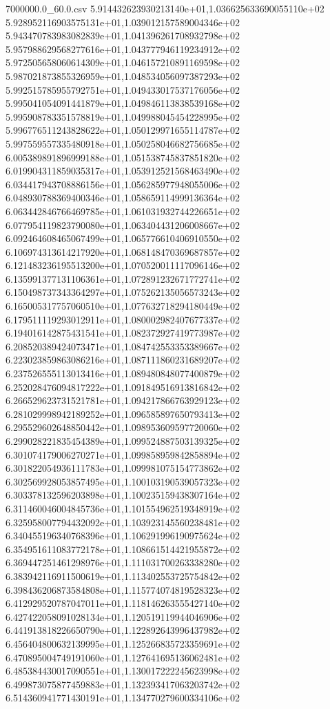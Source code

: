 \begin{filecontents*}{7000000.0_60.0.csv}
5.914432623930213140e+01,1.036625633690055110e+02
5.928952116903575131e+01,1.039012157589004346e+02
5.943470783983082839e+01,1.041396261708932798e+02
5.957988629568277616e+01,1.043777946119234912e+02
5.972505658060614309e+01,1.046157210891169598e+02
5.987021873855326959e+01,1.048534056097387293e+02
5.992515785955792751e+01,1.049433017537176056e+02
5.995041054091441879e+01,1.049846113838539168e+02
5.995908783351578819e+01,1.049988045454228995e+02
5.996776511243828622e+01,1.050129971655114787e+02
5.997559557335480918e+01,1.050258046682756685e+02
6.005389891896999188e+01,1.051538745837851820e+02
6.019904311859035317e+01,1.053912521568463490e+02
6.034417943708886156e+01,1.056285977948055006e+02
6.048930788369400346e+01,1.058659114999136364e+02
6.063442846766469785e+01,1.061031932744226651e+02
6.077954119823790080e+01,1.063404431206008667e+02
6.092464608465067499e+01,1.065776610406910550e+02
6.106974313614217920e+01,1.068148470369687857e+02
6.121483236195513200e+01,1.070520011117096146e+02
6.135991377131106361e+01,1.072891232671772741e+02
6.150498737343364297e+01,1.075262135056573243e+02
6.165005317757060510e+01,1.077632718294180449e+02
6.179511119293012911e+01,1.080002982407677337e+02
6.194016142875431541e+01,1.082372927419773987e+02
6.208520389424073471e+01,1.084742553353389667e+02
6.223023859863086216e+01,1.087111860231689207e+02
6.237526555113013416e+01,1.089480848077400879e+02
6.252028476094817222e+01,1.091849516913816842e+02
6.266529623731521781e+01,1.094217866763929123e+02
6.281029998942189252e+01,1.096585897650793413e+02
6.295529602648850442e+01,1.098953609597720060e+02
6.299028221835454389e+01,1.099524887503139325e+02
6.301074179006270271e+01,1.099858959842858894e+02
6.301822054936111783e+01,1.099981075154773862e+02
6.302569928053857495e+01,1.100103190539057323e+02
6.303378132596203898e+01,1.100235159438307164e+02
6.311460046004845736e+01,1.101554962519348919e+02
6.325958007794432092e+01,1.103923145560238481e+02
6.340455196340768396e+01,1.106291996190975624e+02
6.354951611083772178e+01,1.108661514421955872e+02
6.369447251461298976e+01,1.111031700263338280e+02
6.383942116911500619e+01,1.113402553725754842e+02
6.398436206873584808e+01,1.115774074819528323e+02
6.412929520787047011e+01,1.118146263555427140e+02
6.427422058091028134e+01,1.120519119944046906e+02
6.441913818226650790e+01,1.122892643996437982e+02
6.456404800632139995e+01,1.125266835723359691e+02
6.470895004749191060e+01,1.127641695136062481e+02
6.485384430017090551e+01,1.130017222245623998e+02
6.499873075877459883e+01,1.132393417063203742e+02
6.514360941771430191e+01,1.134770279600334106e+02

\end{filecontents*}
